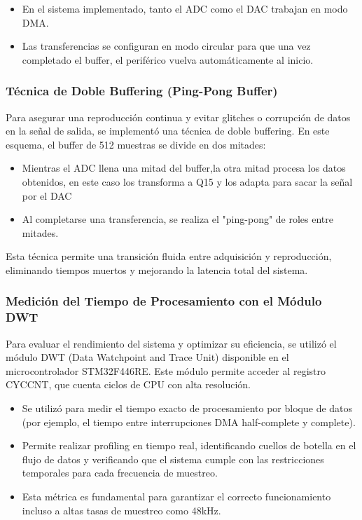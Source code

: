 \documentclass[12pt]{article}
\begin{document}
	\begin{itemize}
		\item En el sistema implementado, tanto el ADC como el DAC trabajan en modo DMA.
		
		\item Las transferencias se configuran en modo circular para que una vez completado el buffer, el periférico vuelva automáticamente al inicio.
	\end{itemize}
	
	\subsubsection{Técnica de Doble Buffering (Ping-Pong Buffer)}
	Para asegurar una reproducción continua y evitar glitches o corrupción de datos en la señal de salida, se implementó una técnica de doble buffering. En este esquema, el buffer de 512 muestras se divide en dos mitades:
	
	\begin{itemize}
		\item Mientras el ADC llena una mitad del buffer,la otra mitad procesa los datos obtenidos, en este caso los transforma a Q15 y los adapta para sacar la señal por el DAC
		
		\item Al completarse una transferencia, se realiza el "ping-pong" de roles entre mitades.
	\end{itemize}
	
	Esta técnica permite una transición fluida entre adquisición y reproducción, eliminando tiempos muertos y mejorando la latencia total del sistema.
	
	\subsubsection{Medición del Tiempo de Procesamiento con el Módulo DWT}
	Para evaluar el rendimiento del sistema y optimizar su eficiencia, se utilizó el módulo DWT (Data Watchpoint and Trace Unit) disponible en el microcontrolador STM32F446RE. Este módulo permite acceder al registro CYCCNT, que cuenta ciclos de CPU con alta resolución.
	
	\begin{itemize}
		\item Se utilizó para medir el tiempo exacto de procesamiento por bloque de datos (por ejemplo, el tiempo entre interrupciones DMA half-complete y complete).
		
		\item Permite realizar profiling en tiempo real, identificando cuellos de botella en el flujo de datos y verificando que el sistema cumple con las restricciones temporales para cada frecuencia de muestreo.
		
		\item Esta métrica es fundamental para garantizar el correcto funcionamiento incluso a altas tasas de muestreo como 48kHz.
	\end{itemize}
	
\end{document}
